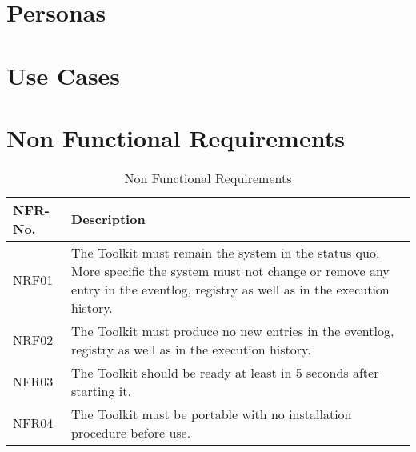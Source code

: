 \newcommand{\TITLE}{Readiness for Tailored Attacks and Lateral Movement Detection}
\newcommand{\VERSION}{0.0}







\newpage

\begin{versionhistory}
\end{versionhistory}


\newpage
\tableofcontents

\newpage
\section{Personas}

\section{Use Cases}

\section{Non Functional Requirements}
\begin{table}[H]
    \centering
    \def\arraystretch{2}
    \begin{tabular}{| p{2.5cm} | p{13.5cm} |} \hline
        \textbf{NFR-No.} & \textbf{Description}  \\ \hline
        NRF01 & The Toolkit must remain the system in the status quo. More specific the system must not change or remove any entry in the eventlog, registry as well as in the execution history. \\ \hline
        NRF02 & The Toolkit must produce no new entries in the eventlog, registry as well as in the execution history. \\ \hline
        NFR03 & The Toolkit should be ready at least in 5 seconds after starting it. \\ \hline
        NFR04 & The Toolkit must be portable with no installation procedure before use. \\ \hline
    \end{tabular}
    \caption{Non Functional Requirements}
\end{table}



\clearpage


